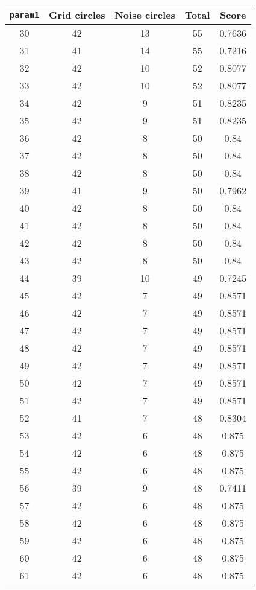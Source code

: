 \documentclass[letterpaper, 12pt]{article}
\begin{document}
\begin{longtable}{|c|c|c|c|c|}
\hline
\textbf{\texttt{param1}} & \textbf{Grid circles} & \textbf{Noise circles} & \textbf{Total} & \textbf{Score} \\
\hline
30 & 42 & 13 & 55 & 0.7636 \\
\hline
31 & 41 & 14 & 55 & 0.7216 \\
\hline
32 & 42 & 10 & 52 & 0.8077 \\
\hline
33 & 42 & 10 & 52 & 0.8077 \\
\hline
34 & 42 & 9 & 51 & 0.8235 \\
\hline
35 & 42 & 9 & 51 & 0.8235 \\
\hline
36 & 42 & 8 & 50 & 0.84 \\
\hline
37 & 42 & 8 & 50 & 0.84 \\
\hline
38 & 42 & 8 & 50 & 0.84 \\
\hline
39 & 41 & 9 & 50 & 0.7962 \\
\hline
40 & 42 & 8 & 50 & 0.84 \\
\hline
41 & 42 & 8 & 50 & 0.84 \\
\hline
42 & 42 & 8 & 50 & 0.84 \\
\hline
43 & 42 & 8 & 50 & 0.84 \\
\hline
44 & 39 & 10 & 49 & 0.7245 \\
\hline
45 & 42 & 7 & 49 & 0.8571 \\
\hline
46 & 42 & 7 & 49 & 0.8571 \\
\hline
47 & 42 & 7 & 49 & 0.8571 \\
\hline
48 & 42 & 7 & 49 & 0.8571 \\
\hline
49 & 42 & 7 & 49 & 0.8571 \\
\hline
50 & 42 & 7 & 49 & 0.8571 \\
\hline
51 & 42 & 7 & 49 & 0.8571 \\
\hline
52 & 41 & 7 & 48 & 0.8304 \\
\hline
53 & 42 & 6 & 48 & 0.875 \\
\hline
54 & 42 & 6 & 48 & 0.875 \\
\hline
55 & 42 & 6 & 48 & 0.875 \\
\hline
56 & 39 & 9 & 48 & 0.7411 \\
\hline
57 & 42 & 6 & 48 & 0.875 \\
\hline
58 & 42 & 6 & 48 & 0.875 \\
\hline
59 & 42 & 6 & 48 & 0.875 \\
\hline
60 & 42 & 6 & 48 & 0.875 \\
\hline
61 & 42 & 6 & 48 & 0.875 \\

\end{longtable}
\end{document}
